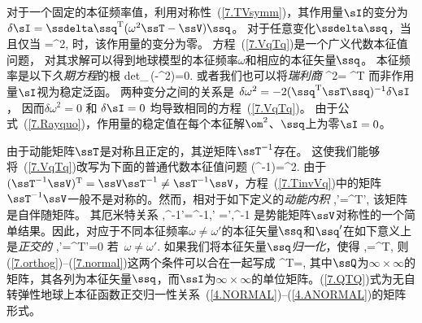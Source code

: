 对于一个固定的本征频率值，利用对称性~(\ref{7.TVsymm})，其作用量$\sI$的变分为
$\delta\sI=\ssdelta\ssq^{\rm T}(\omega^2\ssT-\ssV)\ssq$。
对于任意变化$\ssdelta\ssq$，当且仅当
\eq
\label{7.VqTq}
\ssV\ssq=\omega^2\ssT\ssq,
\en
时，该作用量的变分为零。
方程~(\ref{7.VqTq})是一个广义代数本征值问题，
%
对其求解可以得到地球模型的本征频率$\omega$和相应的本征矢量$\ssq$。
%
本征频率是以下{\em 久期方程\/}的根
%
\eq
\label{7.chareqn}
{\rm det}_{\,}(\ssV-\omega^2\ssT)=0.
\en
或者我们也可以将{\em 瑞利商\/}
%
\eq
\label{7.Rayquo}
\omega^2=
{\ssq^{\rm T}\ssT\ssq}
\en
而非作用量$\sI$视为稳定泛函。
两种变分之间的关系是
$\delta\omega^2=-2(\ssq^{\rm T}\ssT\ssq)^{-1}\delta\sI$，
因而$\delta\omega^2=0$ 和 $\delta\sI=0$ 均导致相同的方程~(\ref{7.VqTq})。
由于公式~(\ref{7.Rayquo})，作用量的稳定值在每个本征解$\om^2$、$\ssq$上为零$\sI=0$。

由于动能矩阵$\ssT$是对称且正定的，其逆矩阵$\ssT^{-1}$存在。
这使我们能够将~(\ref{7.VqTq})改写为下面的普通代数本征值问题
\eq
\label{7.TinvVq}
(\ssT^{-1}\ssV)\ssq=\omega^2\ssq.
\en
由于$(\ssT^{-1}\ssV)^{\rm T}=\ssV\ssT^{-1}\neq\ssT^{-1}\ssV$，方程~(\ref{7.TinvVq})中的矩阵$\ssT^{-1}\ssV$一般不是对称的。然而，相对于如下定义的{\em 动能内积\/}
%
%
\eq
\langle\ssq,\ssq'\rangle=\ssq^{\rm T}\ssT\ssq',
\en
该矩阵是自伴随矩阵。
其厄米特关系
\eq
\langle\ssq,\ssT^{-1}\ssV\ssq'\rangle=\langle\ssT^{-1}\ssV\ssq,\ssq'
\rangle=\langle\ssq',\ssT^{-1}\ssV\ssq\rangle
\en
是势能矩阵$\ssV$对称性的一个简单结果。因此，对应于不同本征频率$\omega\neq\omega'$的本征矢量$\ssq$和$\ssq'$在如下意义上是{\em 正交的\/}
%
\eq
\label{7.orthog}
\langle\ssq,\ssq'\rangle=\ssq^{\rm T}\ssT\ssq'=0
\quad\mbox{若 $\omega\neq\omega'$}.
\en
如果我们将本征矢量$\ssq${\em 归一化\/}，使得
%
\eq
\label{7.normal}
\langle\ssq,\ssq\rangle=\ssq^{\rm T}\ssT{},
\en
则(\ref{7.orthog})--(\ref{7.normal})这两个条件可以合在一起写成
\eq
\label{7.QTQ}
\ssQ^{\rm T}\ssT\ssQ=\ssI,
\en
{}%
其中$\ssQ$为$\infty\times\infty$的矩阵，其各列为本征矢量$\ssq$，而$\ssI$为$\infty\times\infty$的单位矩阵。(\ref{7.QTQ})式为无自转弹性地球上本征函数正交归一性关系~(\ref{4.NORMAL})--(\ref{4.ANORMAL})的矩阵形式。

